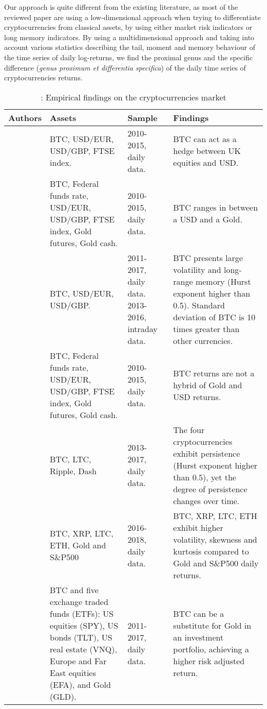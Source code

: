 Our approach is quite different from the existing literature, as most of the reviewed paper are using a low-dimensional approach when trying to differentiate cryptocurrencies from classical assets, by using either market risk indicators or long memory indicators. By using a multidimensional approach and taking into account various statistics describing the tail, moment and memory behaviour of the time series of daily log-returns, we find the proximal genus and the specific difference (\textit{genus proximum et differentia specifica}) of the daily time series of cryptocurrencies returns.
\begin{table}[H]
	\tiny{
\caption{: Empirical findings on the cryptocurrencies market}
\label{table:intro_sources}}

\tiny{
\begin{tabularx}{\textwidth}{p{2cm}|p{4cm}|p{1.5cm}|p{6.3cm}|}
\hline \hline
Authors & Assets & Sample & Findings \\
\hline
\cite{AnneHauboDyhrberg.2016} & BTC, USD/EUR, USD/GBP, FTSE index. & 2010-2015, daily data. & BTC can act as a hedge between UK equities and USD. \\
\cite{Dyhrberg.2016} & BTC, Federal funds rate, USD/EUR, USD/GBP, FTSE index, Gold futures, Gold cash. & 2010-2015, daily data. & BTC ranges in between a USD and a Gold. \\
\cite{AurelioF.Bariviera.2017} & BTC, USD/EUR, USD/GBP. & 2011-2017, daily data. 2013-2016, intraday data. & BTC presents large volatility and long-range memory (Hurst exponent higher than 0.5). Standard deviation of BTC is 10 times greater than other currencies. \\
\cite{Baur.2018} & BTC, Federal  funds rate, USD/EUR, USD/GBP, FTSE index, Gold futures, Gold cash. & 2010-2015, daily data. & BTC returns are not a hybrid of Gold and USD  returns. \\
\cite{GuglielmoMariaCaporale.2018} & BTC, LTC, Ripple, Dash & 2013-2017, daily data. & The four cryptocurrencies exhibit persistence (Hurst exponent higher than 0.5), yet the degree of persistence changes over time. \\
\cite{Hardle.2018} & BTC, XRP, LTC, ETH, Gold and S\&P500 & 2016-2018, daily data. & BTC, XRP, LTC, ETH exhibit higher volatility, skewness and kurtosis compared to Gold and S\&P500 daily returns. \\
\cite{Henriques.2018} & BTC and five exchange traded funds (ETFs): US equities (SPY), US bonds (TLT), US real estate (VNQ), Europe and Far East equities (EFA), and Gold (GLD). & 2011-2017, daily data. & BTC can be a substitute for Gold in an investment portfolio, achieving a higher risk adjusted return. \\

\end{tabularx}}
\end{table}

